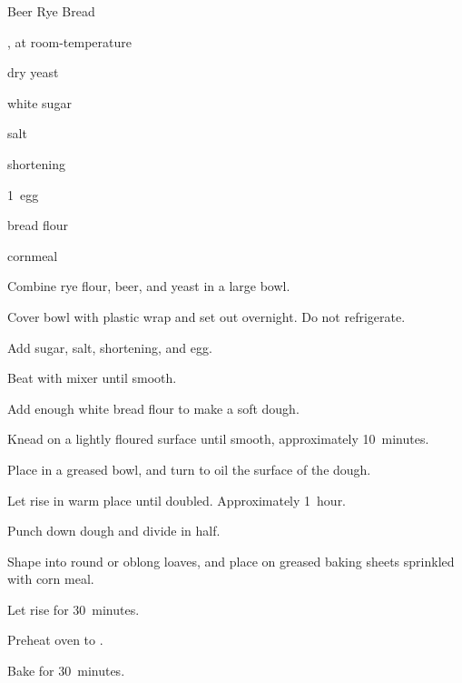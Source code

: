 \begin{recipe}{Beer Rye Bread}{}{}

\begin{ingredients}
\item {} 
\item \C{1\half} , at room-temperature 
\item \tp{4\half} dry yeast
\item {} white sugar
\item {} salt
\item {} shortening
\item 1~egg
\item {} bread flour
\item {} cornmeal
\end{ingredients}

\begin{directions}
\item Combine rye flour, beer, and yeast in a large bowl.
\item Cover bowl with plastic wrap and set out overnight. Do not refrigerate.
\item Add sugar, salt, shortening, and egg.
\item Beat with mixer until smooth.
\item Add enough white bread flour to make a soft dough.
\item Knead on a lightly floured surface until smooth, approximately 10~minutes.
\item Place in a greased bowl, and turn to oil the surface of the dough.
\item Let rise in warm place until doubled. Approximately 1~hour.
\item Punch down dough and divide in half.
\item Shape into round or oblong loaves, and place on greased baking sheets sprinkled with corn meal.
\item Let rise for 30~minutes.
\item Preheat oven to .
\item Bake for 30~minutes.
\end{directions}

\end{recipe}
